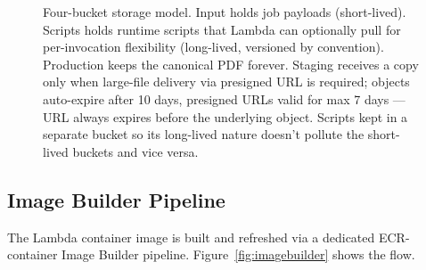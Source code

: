 \documentclass[11pt,letterpaper]{article}
\begin{document}
\begin{figure}[h!]
\begin{tikzpicture}
\end{tikzpicture}
\caption{Four-bucket storage model. Input holds job payloads (short-lived). Scripts holds runtime scripts that Lambda can optionally pull for per-invocation flexibility (long-lived, versioned by convention). Production keeps the canonical PDF forever. Staging receives a copy only when large-file delivery via presigned URL is required; objects auto-expire after 10 days, presigned URLs valid for max 7 days --- URL always expires before the underlying object. Scripts kept in a separate bucket so its long-lived nature doesn't pollute the short-lived buckets and vice versa.}
\label{fig:storage}
\end{figure}

\subsection{Image Builder Pipeline}
\label{sec:meeting-imagebuilder}
The Lambda container image is built and refreshed via a dedicated ECR-container Image Builder pipeline. Figure~\ref{fig:imagebuilder} shows the flow.
\end{document}
